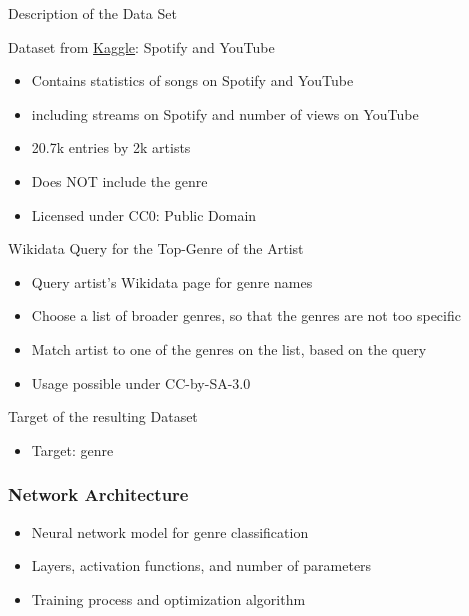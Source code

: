 \documentclass[8pt]{beamer}
\begin{document}
\begin{frame}{Description of the Data Set}
  \begin{alertblock}{Dataset from \href{https://www.kaggle.com/datasets/salvatorerastelli/spotify-and-youtube}{Kaggle}: Spotify and YouTube}
	\begin{itemize}
      \item Contains statistics of songs on Spotify and YouTube
      \item including streams on Spotify and number of views on YouTube
      \item 20.7k entries by 2k artists
      \item Does \alert{NOT} include the genre
      \item Licensed under CC0: Public Domain
    \end{itemize}
  \end{alertblock}
  \begin{alertblock}{Wikidata Query for the Top-Genre of the Artist}
	\begin{itemize}
     \item Query artist's Wikidata page for genre names
     \item Choose a list of broader genres, so that the genres are not too specific
     \item Match artist to one of the genres on the list, based on the query
     \item Usage possible under CC-by-SA-3.0
    \end{itemize}
  \end{alertblock}
  \begin{alertblock}{Target of the resulting Dataset}
	\begin{itemize}
     \item Target: genre
    \end{itemize}
  \end{alertblock}
\end{frame}


\begin{frame}
\frametitle{Network Architecture}

\begin{itemize}
\item Neural network model for genre classification
\item Layers, activation functions, and number of parameters
\item Training process and optimization algorithm
\end{itemize}

\end{frame}
\end{document}
